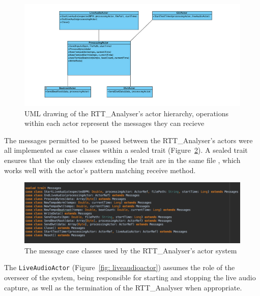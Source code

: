 \documentclass[a4paper, 11pt]{article}
\begin{document}
\begin{figure}[h]
\centering
\includegraphics[scale=0.25]{images/ActorHierachy.jpg}
\caption{UML drawing of the RTT\_Analyser's actor hierarchy, operations within each actor represent the messages they can recieve}
\label{fig: actorHe}
\end{figure} 

The messages permitted to be passed between the RTT\_Analyser's actors were all implemented as case classes within a sealed trait (Figure~\ref{fig: messages}). A sealed trait ensures that the only classes extending the trait are in the same file \cite{odesky}, which works well with the actor's pattern matching receive method.\par

\begin{figure}[h]
\centering
\includegraphics[scale=0.25]{images/messages.jpg}
\caption{The message case classes used by the RTT\_Analyser's actor system}
\label{fig: messages}
\end{figure} 

The \texttt{LiveAudioActor} (Figure~\ref{fig: liveaudioactor}) assumes the role of the overseer  of the system, being responsible for starting and stopping the live audio capture, as well as the termination of the RTT\_Analyser when appropriate. \par
\end{document}
